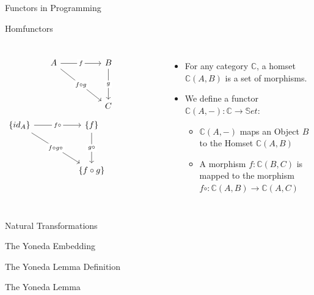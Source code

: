 \documentclass[aspectratio=169]{beamer} %
\newcommand{\bC}{\mathbb{C}}
\begin{document}
{\begin{frame}[fragile]{Functors in Programming}
\begin{itemize}
 \end{itemize}
\end{frame}
\fi
\begin{frame}[fragile]{Homfunctors}
\begin{columns}
\[\begin{tikzcd}
	A && B \\
	\\
	&& C
	\arrow["f"{description}, from=1-1, to=1-3]
	\arrow["{f \circ g}"{description}, from=1-1, to=3-3]
	\arrow["g"{description}, from=1-3, to=3-3]
\end{tikzcd}\]
\[\begin{tikzcd}
	{\{id_A\}} && {\{f\}} && {} \\
	\\
	&& {\{f \circ g\}}
	\arrow["{f \circ}"{description}, from=1-1, to=1-3]
	\arrow["{f \circ g \circ}"{description}, from=1-1, to=3-3]
	\arrow["{g \circ}"{description}, from=1-3, to=3-3]
\end{tikzcd}\]
 \begin{itemize}
  \item For any category $\bC$, a homset $\bC(A,B)$ is a set of morphisms.
  \item We define a functor $\bC(A, -) : \bC \to \mathbb{S}et$:
  \begin{itemize}
    \item $\bC(A, -)$ maps an Object $B$ to the Homset $\bC(A,B)$
    \item A morphism $f : \bC(B,C)$ is mapped to the morphism $f \circ : \bC(A,B) \to \bC(A,C)$
  \end{itemize}
 \end{itemize}
 \end{columns}
\end{frame}
\begin{frame}{Natural Transformations}
\end{frame}
\begin{frame}{The Yoneda Embedding}
\end{frame}
\begin{frame}{The Yoneda Lemma}
Definition
\end{frame}
\begin{frame}{The Yoneda Lemma}

\end{frame}}
\end{document}
